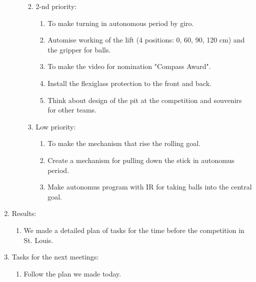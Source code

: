 \begin{enumerate}
\begin{enumerate}
\begin{enumerate}
\begin{enumerate}
			\end{enumerate}
			
			\item 2-nd priority:
			\begin{enumerate}
				
				\item To make turning in autonomous period by giro.
				
				\item Automise working of the lift (4 positions: 0, 60, 90, 120 cm) and the gripper for balls.
				
				\item To make the video for nomination "Compass Award".
				
				\item Install the flexiglass protection to the front and back.
				
				\item Think about design of the pit at the competition and souvenirs for other teams.
				
			\end{enumerate}
			
			\item Low priority:
			\begin{enumerate}
				
				\item To make the mechanism that rise the rolling goal.
				
				\item Create a mechanism for pulling down the stick in autonomus period.
				
				\item Make autonomus program with IR for taking balls into the central goal.
				
			\end{enumerate}
		\end{enumerate}
		
	\end{enumerate}
	
	\item Results:
	\begin{enumerate}
		
		\item We made a detailed plan of tasks for the time before the competition in St. Louis.
		
	\end{enumerate}
	
	\item Tasks for the next meetings:
	\begin{enumerate}
		
		\item Follow the plan we made today.
			
	\end{enumerate}
\end{enumerate}
\fillpage
